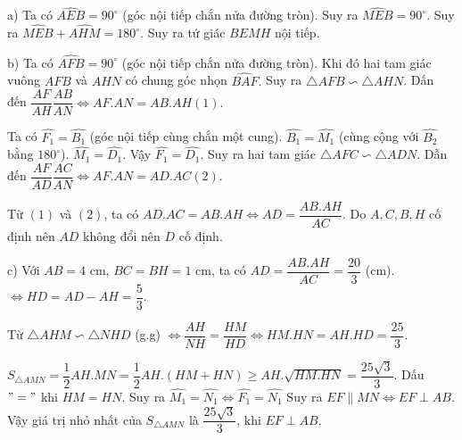 \begin{ex}
{\begin{center}
\end{center}
 a)  Ta có $\widehat{AEB} = 90^{\circ}$ (góc nội tiếp chắn nửa đường tròn). Suy ra $\widehat{MEB} = 90^{\circ}$. Suy ra $\widehat{MEB} + \widehat{AHM} = 180^{\circ}.$ Suy ra tứ giác $BEMH$ nội tiếp.

\noindent b) Ta có  $\widehat{AFB} = 90^{\circ}$ (góc nội tiếp chắn nửa đường tròn). Khi đó hai tam giác vuông $AFB$ và $AHN$ có chung góc nhọn   $\widehat{BAF}.$ Suy ra $\triangle AFB \backsim \triangle AHN$. Dấn đến $\dfrac{AF}{AH} \dfrac{AB}{AN} \Leftrightarrow AF.AN = AB.AH (1).$

Ta có $\widehat{F_1} = \widehat{B_1}$ (góc nội tiếp cùng chắn một cung).  $\widehat{B_1} = \widehat{M_1}$ (cùng cộng với $ \widehat{B_2} $ bằng $ 180^{\circ}$).  $\widehat{M_1} = \widehat{D_1}$. Vậy $\widehat{F_1} = \widehat{D_1}$. Suy ra hai tam giác $\triangle AFC \backsim \triangle ADN.$ Dẫn đến $\dfrac{AF}{AD} \dfrac{AC}{AN} \Leftrightarrow AF.AN = AD.AC (2).$

Từ $(1)$ và $(2)$, ta có $AD.AC= AB.AH \Leftrightarrow AD = \dfrac{AB.AH}{AC}$. Do $A,C,B,H$ cố định nên $AD$ không đổi nên $D$ cố định.

\noindent c) Với $AB = 4$ cm, $BC = BH = 1$ cm, ta có $AD = \dfrac{AB.AH}{AC} = \dfrac{20}{3}$ (cm). $\Leftrightarrow HD = AD-AH = \dfrac{5}{3}.$

Từ $\triangle AHM \backsim \triangle NHD$ (g.g) $\Leftrightarrow \dfrac{AH}{NH} = \dfrac{HM}{HD} \Leftrightarrow HM.HN = AH.HD = \dfrac{25}{3}.$ 

 $S_{\triangle AMN} = \dfrac{1}{2}AH.MN =  \dfrac{1}{2}AH.(HM+HN) \ge AH.\sqrt{HM.HN} = \dfrac{25\sqrt{3}}{3}. $ Dấu $"="$ khi $HM=HN$. Suy ra $\widehat{M_1}=\widehat{N_1}\Leftrightarrow \widehat{F_1}=\widehat{N_1} $ Suy ra $EF \parallel MN \Leftrightarrow EF \perp AB.$  Vậy giá trị nhỏ nhất của $S_{\triangle AMN} $ là $\dfrac{25\sqrt{3}}{3}$, khi $ EF \perp AB.$
 }
\end{ex}

